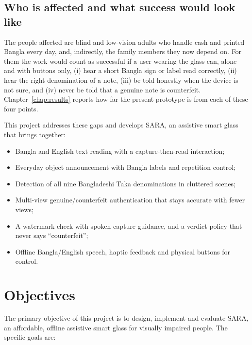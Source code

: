 \subsection*{Who is affected and what success would look like}
The people affected are blind and low-vision adults who handle cash and printed Bangla every day, and, indirectly, the family members they now depend on. For them the work would count as successful if a user wearing the glass can, alone and with buttons only, (i) hear a short Bangla sign or label read correctly, (ii) hear the right denomination of a note, (iii) be told honestly when the device is not sure, and (iv) never be told that a genuine note is counterfeit. Chapter~\ref{chap:results} reports how far the present prototype is from each of these four points.

This project addresses these gaps and develops SARA, an assistive smart glass that brings together:

\begin{itemize}[noitemsep]
    \item Bangla and English text reading with a capture-then-read interaction;
    \item Everyday object announcement with Bangla labels and repetition control;
    \item Detection of all nine Bangladeshi Taka denominations in cluttered scenes;
    \item Multi-view genuine/counterfeit authentication that stays accurate with fewer views;
    \item A watermark check with spoken capture guidance, and a verdict policy that never says ``counterfeit'';
    \item Offline Bangla/English speech, haptic feedback and physical buttons for control.
\end{itemize}


\section{Objectives}
\label{sec:Objective}

The primary objective of this project is to design, implement and evaluate SARA, an affordable, offline assistive smart glass for visually impaired people. The specific goals are:

